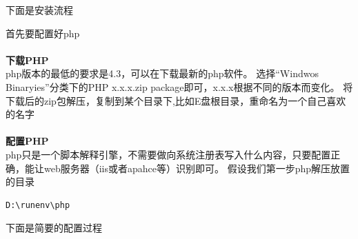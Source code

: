 \documentclass{article}
\begin{document}
下面是安装流程

首先要配置好php

\paragraph{}\textbf{下载PHP}\\

php版本的最低的要求是4.3，可以在下载最新的php软件。
选择“Windwos Binaryies”分类下的PHP x.x.x.zip package即可，x.x.x根据不同的版本而变化。
将下载后的zip包解压，复制到某个目录下,比如E盘根目录，重命名为一个自己喜欢的名字 

\paragraph{}\textbf{配置PHP}\\

php只是一个脚本解释引擎，不需要做向系统注册表写入什么内容，只要配置正确，能让web服务器（iis或者apahce等）识别即可。
假设我们第一步php解压放置的目录

\begin{verbatim}
D:\runenv\php
\end{verbatim}
下面是简要的配置过程
\end{document}
